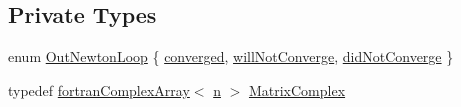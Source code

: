 \subsection*{Private Types}
\begin{DoxyCompactItemize}
\item 
enum \hyperlink{classodes_1_1Radau5cc_a530d53d29f5c75bb20865fb786cd5f2d}{Out\+Newton\+Loop} \{ \hyperlink{classodes_1_1Radau5cc_a530d53d29f5c75bb20865fb786cd5f2da9c86014618b5c6f2e6ce53e385cd80f7}{converged}, 
\hyperlink{classodes_1_1Radau5cc_a530d53d29f5c75bb20865fb786cd5f2dade02d21b4fd6d41fda13e76994c35ea2}{will\+Not\+Converge}, 
\hyperlink{classodes_1_1Radau5cc_a530d53d29f5c75bb20865fb786cd5f2da649d2035432ef689c9c03cdd074a1ded}{did\+Not\+Converge}
 \}
\item 
typedef \hyperlink{classodes_1_1fortranComplexArray}{fortran\+Complex\+Array}$<$ \hyperlink{classodes_1_1Radau5cc_a3be3f05d2cdf7268e7d09b62ad9ad494}{n} $>$ \hyperlink{classodes_1_1Matrices_aa1313b5ab7fdab6f5320c8d5aa3bfc24}{Matrix\+Complex}
\end{DoxyCompactItemize}
